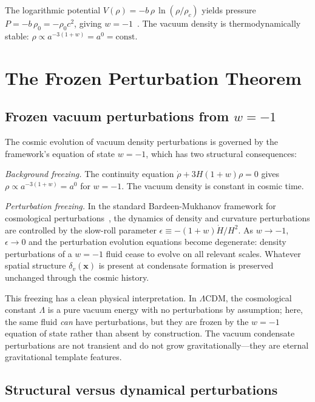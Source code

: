 \documentclass[12pt, a4paper]{article}
\begin{document}
The logarithmic potential $V(\rho) = -b\,\rho\,\ln(\rho/\rho_c)$ yields pressure $P = -b\,\rho_0 = -\rho_0 c^2$, giving $w = -1$~\cite{kulangiev_2026c_cosmo}. The vacuum density is thermodynamically stable: $\rho \propto a^{-3(1+w)} = a^0 = \text{const}$.


\newpage
\section{The Frozen Perturbation Theorem}
\label{sec:frozen}

\subsection{Frozen vacuum perturbations from \texorpdfstring{$w = -1$}{w = -1}}

The cosmic evolution of vacuum density perturbations is governed by the framework's equation of state $w = -1$, which has two structural consequences:

\emph{Background freezing.} The continuity equation $\dot{\rho} + 3H(1+w)\rho = 0$ gives $\rho \propto a^{-3(1+w)} = a^0$ for $w = -1$. The vacuum density is constant in cosmic time.

\emph{Perturbation freezing.} In the standard Bardeen-Mukhanov framework for cosmological perturbations~\cite{bardeen_1980,mukhanov_1992}, the dynamics of density and curvature perturbations are controlled by the slow-roll parameter $\epsilon \equiv -(1+w)\dot{H}/H^2$. As $w \to -1$, $\epsilon \to 0$ and the perturbation evolution equations become degenerate: density perturbations of a $w = -1$ fluid cease to evolve on all relevant scales. Whatever spatial structure $\delta_v(\mathbf{x})$ is present at condensate formation is preserved unchanged through the cosmic history.

This freezing has a clean physical interpretation. In $\Lambda$CDM, the cosmological constant $\Lambda$ is a pure vacuum energy with no perturbations by assumption; here, the same fluid \emph{can} have perturbations, but they are frozen by the $w = -1$ equation of state rather than absent by construction. The vacuum condensate perturbations are not transient and do not grow gravitationally---they are eternal gravitational template features.

\subsection{Structural versus dynamical perturbations}
\end{document}
